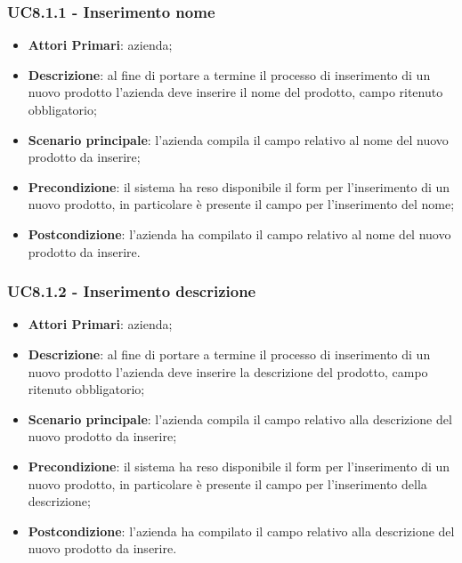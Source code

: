\subsubsection{UC8.1.1 - Inserimento nome}
\begin{itemize}
	\item \textbf{Attori Primari}: azienda;
	\item \textbf{Descrizione}: al fine di portare a termine il processo di inserimento di un nuovo prodotto l'azienda deve inserire il nome del prodotto, campo ritenuto obbligatorio;
	\item \textbf{Scenario principale}: l'azienda compila il campo relativo al nome del nuovo prodotto da inserire;
	\item \textbf{Precondizione}: il sistema ha reso disponibile il form per l'inserimento di un nuovo prodotto, in particolare è presente il campo per l'inserimento del nome;
	\item \textbf{Postcondizione}: l'azienda ha compilato il campo relativo al nome del nuovo prodotto da inserire.
\end{itemize}
\subsubsection{UC8.1.2 - Inserimento descrizione}
\begin{itemize}
	\item \textbf{Attori Primari}: azienda;
	\item \textbf{Descrizione}: al fine di portare a termine il processo di inserimento di un nuovo prodotto l'azienda deve inserire la descrizione del prodotto, campo ritenuto obbligatorio;
	\item \textbf{Scenario principale}: l'azienda compila il campo relativo alla descrizione del nuovo prodotto da inserire;
	\item \textbf{Precondizione}: il sistema ha reso disponibile il form per l'inserimento di un nuovo prodotto, in particolare è presente il campo per l'inserimento della descrizione;
	\item \textbf{Postcondizione}: l'azienda ha compilato il campo relativo alla descrizione del nuovo prodotto da inserire.
\end{itemize}
